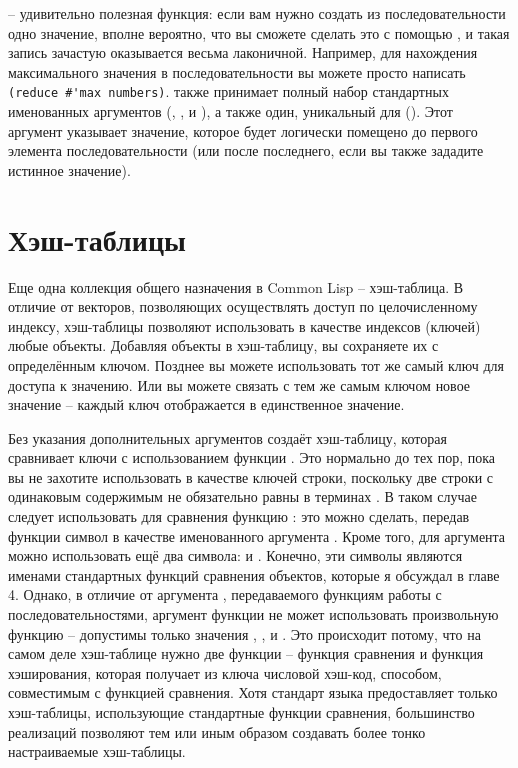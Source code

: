  -- удивительно полезная функция: если вам нужно создать из
последовательности одно значение, вполне вероятно, что вы сможете сделать это с помощью
, и такая запись зачастую оказывается весьма лаконичной.
Например, для нахождения максимального значения в последовательности вы можете просто
написать \lstinline!(reduce #'max numbers)!.  также принимает полный набор
стандартных именованных аргументов (, ,  и
), а также один, уникальный для  ().  Этот
аргумент указывает значение, которое будет логически помещено до первого элемента
последовательности (или после последнего, если вы также зададите  истинное
значение).

\section{Хэш-таблицы}

Еще одна коллекция общего назначения в Common Lisp -- хэш-таблица.  В отличие от векторов,
позволяющих осуществлять доступ по целочисленному индексу,
хэш-таблицы позволяют использовать в качестве индексов (ключей) любые объекты.
Добавляя объекты в хэш-таблицу, вы сохраняете их с определённым ключом.  Позднее вы
можете использовать тот же самый ключ для доступа к значению.  Или вы можете связать
с тем же самым ключом новое значение -- каждый ключ отображается в единственное значение.

Без указания дополнительных аргументов  создаёт хэш-таблицу, которая
сравнивает ключи с использованием функции .  Это нормально до тех пор, пока вы
не захотите использовать в качестве ключей строки, поскольку две строки с одинаковым
содержимым не обязательно равны в терминах .  В таком случае следует
использовать для сравнения функцию : это можно сделать, передав функции
 символ  в качестве именованного аргумента .
Кроме того, для аргумента  можно использовать ещё два символа:  и
.  Конечно, эти символы являются именами стандартных функций сравнения
объектов, которые я обсуждал в главе 4.  Однако, в отличие от аргумента ,
передаваемого функциям работы с последовательностями, аргумент  функции
 не может использовать произвольную функцию -- допустимы только
значения , ,  и .  Это происходит потому, что
на самом деле хэш-таблице нужно две функции -- функция сравнения и функция
хэширования, которая получает из ключа числовой хэш-код, способом, совместимым с
функцией сравнения.  Хотя стандарт языка предоставляет
только хэш-таблицы, использующие стандартные функции сравнения, большинство
реализаций позволяют тем или иным образом создавать более тонко настраиваемые
хэш-таблицы.

